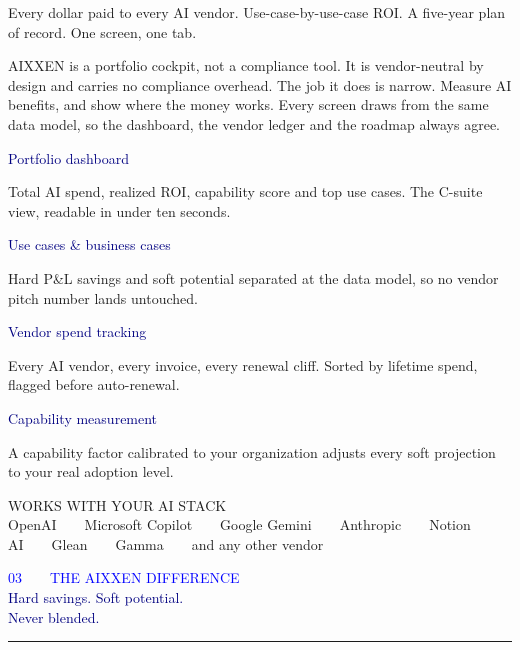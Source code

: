 \documentclass[10pt]{article}
\newcommand{\bodysize}{\fontsize{9.6}{15.2}\selectfont}
\newcommand{\sectionhead}[3]{%
  {\semibold\fontsize{8}{8}\selectfont\textcolor{blue}{#1\ \ \textbullet\ \ \MakeUppercase{#2}}}\\[5pt]
  {\black\fontsize{25}{28}\selectfont\textcolor{navy}{#3}}\\[6pt]
  {\color{blue}\rule{40pt}{2.8pt}}\par\vspace{14pt}}
\newcommand{\body}[1]{{\bodysize\textcolor{ink}{#1}\par}}
\newcommand{\lead}[1]{{\medium\fontsize{11.5}{16}\selectfont\textcolor{slate}{#1}\par}}
\newcommand{\cardtitle}[1]{{\heavy\fontsize{10.5}{12}\selectfont\textcolor{navy}{#1}\par\vspace{3pt}}}
\begin{document}
\lead{Every dollar paid to every AI vendor. Use-case-by-use-case ROI. A five-year plan of record. One screen, one tab.}
\vspace{14pt}
\body{AIXXEN is a portfolio cockpit, not a compliance tool. It is vendor-neutral by design and carries no compliance overhead. The job it does is narrow. Measure AI benefits, and show where the money works. Every screen draws from the same data model, so the dashboard, the vendor ledger and the roadmap always agree.}
\vspace{18pt}

\newcommand{\quadcard}[2]{%
\begin{tile}
\cardtitle{#1}
{\fontsize{8.7}{12.4}\selectfont\textcolor{slate}{#2}}
\end{tile}}

\begin{minipage}[t]{0.485\textwidth}
\quadcard{Portfolio dashboard}{Total AI spend, realized ROI, capability score and top use cases. The C-suite view, readable in under ten seconds.}
\vspace{10pt}
\quadcard{Use cases \& business cases}{Hard P\&L savings and soft potential separated at the data model, so no vendor pitch number lands untouched.}
\end{minipage}\hfill
\begin{minipage}[t]{0.485\textwidth}
\quadcard{Vendor spend tracking}{Every AI vendor, every invoice, every renewal cliff. Sorted by lifetime spend, flagged before auto-renewal.}
\vspace{10pt}
\quadcard{Capability measurement}{A capability factor calibrated to your organization adjusts every soft projection to your real adoption level.}
\end{minipage}

\vspace{20pt}
\begin{navyblock}
{\semibold\fontsize{8}{8}\selectfont\textcolor{midblue}{WORKS WITH YOUR AI STACK}}\\[6pt]
{\medium\fontsize{10.3}{16}\selectfont OpenAI\ \ \textbullet\ \ Microsoft Copilot\ \ \textbullet\ \ Google Gemini\ \ \textbullet\ \ Anthropic\ \ \textbullet\ \ Notion AI\ \ \textbullet\ \ Glean\ \ \textbullet\ \ Gamma\ \ \textbullet\ \ and any other vendor}
\end{navyblock}
\newpage

\sectionhead{03}{The AIXXEN Difference}{Hard savings. Soft potential.\\Never blended.}
\end{document}
